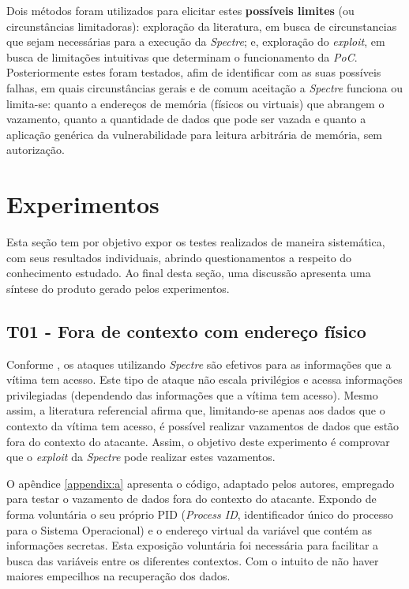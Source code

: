 \documentclass[conference]{IEEEtran}
\begin{document}
Dois métodos foram utilizados para elicitar estes \textbf{possíveis limites} (ou circunstâncias limitadoras): exploração da literatura, em busca de circunstancias que sejam necessárias para a execução da \emph{Spectre}; e, exploração do \emph{exploit}, em busca de limitações intuitivas que determinam o funcionamento da \emph{PoC}. Posteriormente estes foram testados, afim de identificar com as suas possíveis falhas, em quais circunstâncias gerais e de comum aceitação a \emph{Spectre} funciona ou limita-se: quanto a endereços de memória (físicos ou virtuais) que abrangem o vazamento, quanto a quantidade de dados que pode ser vazada e quanto a aplicação genérica da vulnerabilidade para leitura arbitrária de memória, sem autorização.

\section{Experimentos}
Esta seção tem por objetivo expor os testes realizados de maneira sistemática, com seus resultados individuais, abrindo questionamentos a respeito do conhecimento estudado. Ao final desta seção, uma discussão apresenta uma síntese do produto gerado pelos experimentos.
\subsection{T01 - Fora de contexto com endereço físico}
Conforme , os ataques utilizando \emph{Spectre} são efetivos para as informações que a vítima tem acesso. Este tipo de ataque não escala privilégios e acessa informações privilegiadas (dependendo das informações que a vítima tem acesso). Mesmo assim, a literatura referencial afirma que, limitando-se apenas aos dados que o contexto da vítima tem acesso, é possível realizar vazamentos de dados que estão fora do contexto do atacante. Assim, o objetivo deste experimento é comprovar que o \emph{exploit} da \emph{Spectre} pode realizar estes vazamentos.

O apêndice \ref{appendix:a} apresenta o código, adaptado pelos autores, empregado para testar o vazamento de dados fora do contexto do atacante. Expondo de forma voluntária o seu próprio PID (\emph{Process ID}, identificador único do processo para o Sistema Operacional) e o endereço virtual da variável que contém as informações secretas. Esta exposição voluntária foi necessária para facilitar a busca das variáveis entre os diferentes contextos. Com o intuito de não haver maiores empecilhos na recuperação dos dados.
\end{document}
